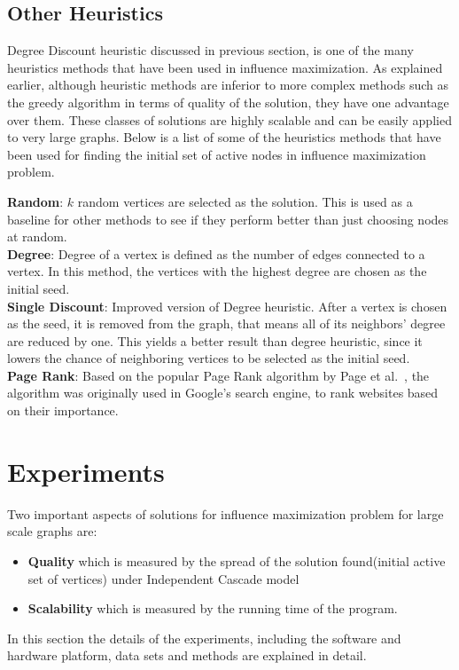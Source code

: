 \documentclass[english]{tktltiki}
\begin{document}
\subsection{Other Heuristics}
Degree Discount heuristic discussed in previous section, is one of the many heuristics methods that have been used in influence maximization. 
As explained earlier, although heuristic methods are inferior to more complex methods such as the greedy algorithm in terms of quality of the solution, they have one advantage over them. 
These classes of solutions are highly scalable and can be easily applied to very large graphs. 
Below is a list of some of the heuristics methods that have been used for finding the initial set of active nodes in influence maximization problem.

\textbf{Random}: $k$ random vertices are selected as the solution. 
This is used as a baseline for other methods to see if they perform better than just choosing nodes at random.\\
\textbf{Degree}: Degree of a vertex is defined as the number of edges connected to a vertex. 
In this method, the vertices with the highest degree are chosen as the initial seed. \\
\textbf{Single Discount}: Improved version of Degree heuristic. After a vertex is chosen as the seed, it is removed from the graph, that means all of its neighbors' degree are reduced by one.
This yields a better result than degree heuristic, since it lowers the chance of neighboring vertices to be selected as the initial seed. \\
\textbf {Page Rank}: Based on the popular Page Rank algorithm by Page et al.\ \cite{page98}, the algorithm was originally used in Google's search engine, to rank websites based on their importance. 
\newpage


\section{Experiments}
\label{sec:experiments}
Two important aspects of solutions for influence maximization problem for large scale graphs are:
\begin{itemize}
\item \textbf{Quality} which is measured by the spread of the solution found(initial active set of vertices) under Independent Cascade model
\item \textbf{Scalability} which is measured by the running time of the program. 
\end{itemize}
In this section the details of the experiments, including the software and hardware platform, data sets and methods are explained in detail.
\end{document}
